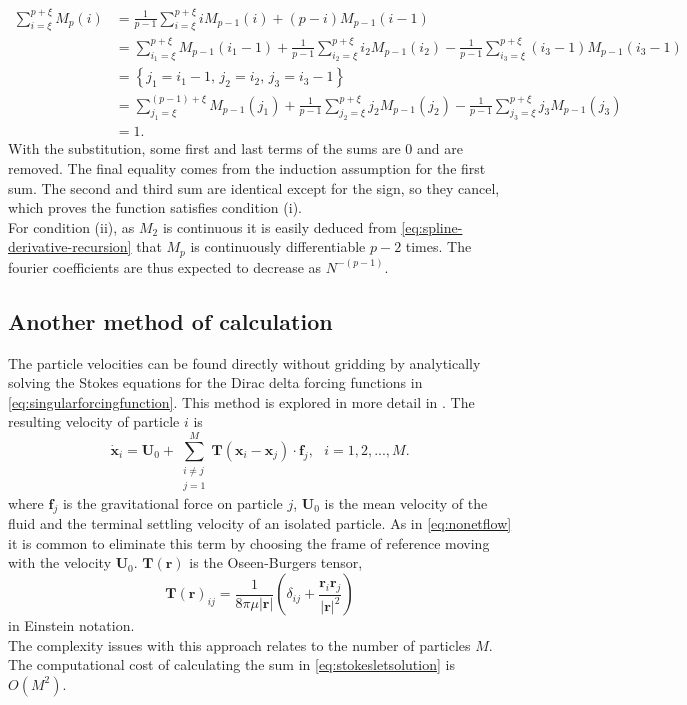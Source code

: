 \documentclass[a4paper,
twoside=false,abstract=false,numbers=noenddot,
titlepage=false,headings=small,parskip=half,version=last]{scrartcl}
\begin{document}
\begin{align}
\sum_{i=\xi}^{p+\xi} M_p(i) &= \frac{1}{p-1}\sum_{i=\xi}^{p+\xi} iM_{p-1}(i) + (p-i)M_{p-1}(i-1)\nonumber\\
		&= \sum_{i_1=\xi}^{p+\xi} M_{p-1}(i_1-1) + \frac{1}{p-1}\sum_{i_2=\xi}^{p+\xi} i_2M_{p-1}(i_2) - \frac{1}{p-1}\sum_{i_3=\xi}^{p+\xi} (i_3-1)M_{p-1}(i_3-1)\nonumber\\
		&= \left\{ j_1 = i_1-1\text{, } j_2 = i_2\text{, }j_3 = i_3-1\right\}\nonumber\\
		&= \sum_{j_1=\xi}^{(p-1)+\xi} M_{p-1}(j_1) + \frac{1}{p-1}\sum_{j_2=\xi}^{p+\xi} j_2M_{p-1}(j_2) - \frac{1}{p-1}\sum_{j_3=\xi}^{p+\xi} j_3M_{p-1}(j_3)\nonumber\\
		&= 1.\nonumber
\end{align}
With the substitution, some first and last terms of the sums are 0 and are removed.
The final equality comes from the induction assumption for the first sum.
The second and third sum are identical except for the sign, so they cancel, which proves the function satisfies condition (i).\\
For condition (ii), as $M_2$ is continuous it is easily deduced from \eqref{eq:spline-derivative-recursion} that $M_p$ is continuously differentiable $p-2$ times. The fourier coefficients are thus expected to decrease as $N^{-(p-1)}$.

\subsection{Another method of calculation}
The particle velocities can be found directly without gridding by analytically solving the Stokes equations for the Dirac delta forcing functions in \eqref{eq:singularforcingfunction}. This method is explored in more detail in \cite{fallingclouds}.
The resulting velocity of particle $i$ is
\begin{equation}
\dot{\mathbf{x}}_i = \mathbf{U}_0 + \sum_{\substack{i\neq j\\j=1}}^{M} \mathbf{T}(\mathbf{x}_i-\mathbf{x}_j) \cdot \mathbf{f}_j,\text{ }i=1,2,...,M.\label{eq:stokesletsolution}
\end{equation}
where $\mathbf{f}_j$ is the gravitational force on particle $j$, $\mathbf{U}_0$ is the mean velocity of the fluid and the terminal settling velocity of an isolated particle.
As in \eqref{eq:nonetflow} it is common to eliminate this term by choosing the frame of reference moving with the velocity $\mathbf{U}_0$. $\mathbf{T}(\mathbf{r})$ is the Oseen-Burgers tensor,
\begin{equation}
\mathbf{T}(\mathbf{r})_{ij} = \frac{1}{8\pi \mu |\mathbf{r}|} \left( \delta_{ij} + \frac{\mathbf{r}_i \mathbf{r}_j}{|\mathbf{r}|^2}\right)\nonumber
\end{equation}
in Einstein notation.\\
The complexity issues with this approach relates to the number of particles $M$. The computational cost of calculating the sum in \eqref{eq:stokesletsolution} is $O(M^2)$.
\end{document}
